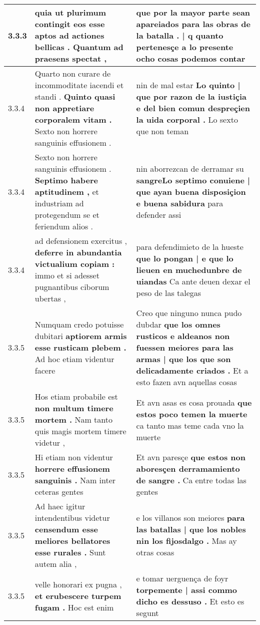 \begin{tabular}{|p{1cm}|p{6.5cm}|p{6.5cm}|}
3.3.3 & quia ut plurimum contingit \textbf{ eos esse aptos ad actiones bellicas . } Quantum ad praesens spectat , & que por la mayor parte sean apareiados \textbf{ para las obras de la batalla . |  } q quanto pertenesçe a lo presente ocho cosas podemos contar \\\hline
3.3.4 & Quarto non curare de incommoditate iacendi et standi . \textbf{ Quinto quasi non appretiare corporalem vitam . } Sexto non horrere sanguinis effusionem . & nin de mal estar \textbf{ Lo quinto | que por razon de la iustiçia e del bien comun despreçien la uida corporal . } Lo sexto que non teman \\\hline
3.3.4 & Sexto non horrere sanguinis effusionem . \textbf{ Septimo habere aptitudinem , } et industriam ad protegendum se et feriendum alios . & nin aborrezcan de derramar su \textbf{ sangreLo septimo conuiene | que ayan buena disposiçion e buena sabidura } para defender assi \\\hline
3.3.4 & ad defensionem exercitus , \textbf{ deferre in abundantia victualium copiam : } immo et si adesset pugnantibus ciborum ubertas , & para defendimieto de la hueste \textbf{ que lo pongan | e que lo lieuen en muchedunbre de uiandas } Ca ante deuen dexar el peso de las talegas \\\hline
3.3.5 & Numquam credo potuisse dubitari \textbf{ aptiorem armis esse rusticam plebem . } Ad hoc etiam videntur facere & Creo que ninguno nunca pudo dubdar \textbf{ que los omnes rusticos e aldeanos non fuessen meiores para las armas | que los que son delicadamente criados . } Et a esto fazen avn aquellas cosas \\\hline
3.3.5 & Hos etiam probabile est \textbf{ non multum timere mortem . } Nam tanto quis magis mortem timere videtur , & Et avn asas es cosa prouada \textbf{ que estos poco temen la muerte } ca tanto mas teme cada vno la muerte \\\hline
3.3.5 & Hi etiam non videntur \textbf{ horrere effusionem sanguinis . } Nam inter ceteras gentes & Et avn paresçe \textbf{ que estos non aboresçen derramamiento de sangre . } Ca entre todas las gentes \\\hline
3.3.5 & Ad haec igitur intendentibus videtur \textbf{ censendum esse meliores bellatores esse rurales . } Sunt autem alia , & e los villanos son meiores \textbf{ para las batallas | que los nobles nin los fijosdalgo . } Mas ay otras cosas \\\hline
3.3.5 & velle honorari ex pugna , \textbf{ et erubescere turpem fugam . } Hoc est enim & e tomar uerguença de foyr \textbf{ torpemente | assi commo dicho es dessuso . } Et esto es segunt \\\hline

\end{tabular}
